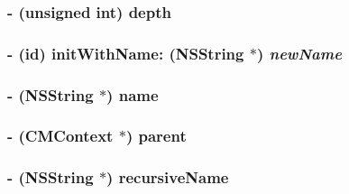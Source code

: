 \hypertarget{interface_c_m_context_c456cbfa10d53fcd6c7ec7fdab0644d5}{
\subsubsection[depth]{\setlength{\rightskip}{0pt plus 5cm}- (unsigned int) depth }}
\label{interface_c_m_context_c456cbfa10d53fcd6c7ec7fdab0644d5}


\hypertarget{interface_c_m_context_44890ef96f04231219626f757c7622dd}{
\subsubsection[initWithName:]{\setlength{\rightskip}{0pt plus 5cm}- (id) initWithName: ({\bf NSString} $\ast$) {\em newName}}}
\label{interface_c_m_context_44890ef96f04231219626f757c7622dd}


\hypertarget{interface_c_m_context_09bba5cf669815a66c52b7d9a7a04aff}{
\subsubsection[name]{\setlength{\rightskip}{0pt plus 5cm}- ({\bf NSString} $\ast$) {\bf name} }}
\label{interface_c_m_context_09bba5cf669815a66c52b7d9a7a04aff}


\hypertarget{interface_c_m_context_097e65518b8aff7b0b4d7967eb303ccd}{
\subsubsection[parent]{\setlength{\rightskip}{0pt plus 5cm}- ({\bf CMContext} $\ast$) {\bf parent} }}
\label{interface_c_m_context_097e65518b8aff7b0b4d7967eb303ccd}


\hypertarget{interface_c_m_context_274205e5dc456dc18d30fe1a187cbed2}{
\subsubsection[recursiveName]{\setlength{\rightskip}{0pt plus 5cm}- ({\bf NSString} $\ast$) recursiveName }}
\label{interface_c_m_context_274205e5dc456dc18d30fe1a187cbed2}


